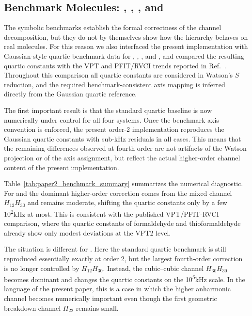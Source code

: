 \documentclass[aip,jcp,reprint]{revtex4-2}
\begin{document}
\subsection{Benchmark Molecules: \texorpdfstring{, , , and }{H2O, H2S, H2CO, and H2CS}}

The symbolic benchmarks establish the formal correctness of the channel
decomposition, but they do not by themselves show how the hierarchy
behaves on real molecules.  For this reason we also interfaced the
present implementation with Gaussian-style quartic benchmark data for
, , , and , and compared the resulting
quartic constants with the VPT and PFIT/RVCI trends reported in
Ref.~.  Throughout this comparison all quartic
constants are considered in Watson's $S$ reduction, and the required
benchmark-consistent axis mapping is inferred directly from the
Gaussian quartic reference.

The first important result is that the standard quartic baseline is now
numerically under control for all four systems.  Once the benchmark
axis convention is enforced, the present order-2 implementation
reproduces the Gaussian quartic constants with sub-\si{kHz} residuals in
all cases.  This means that the remaining differences observed at
fourth order are not artifacts of the Watson projection or of the axis
assignment, but reflect the actual higher-order channel content of the
present implementation.

Table~\ref{tab:paper2_benchmark_summary} summarizes the numerical
diagnostic.  For  and  the dominant higher-order
correction comes from the mixed channel $H_{12}H_{30}$ and remains
moderate, shifting the quartic constants only by a few
\si{10^2}{kHz} at most.  This is consistent with the published VPT/PFIT-RVCI
comparison, where the quartic constants of formaldehyde and
thioformaldehyde already show only modest deviations at the VPT2
level.\cite{Dinu2022}

The situation is different for .  Here the standard quartic
benchmark is still reproduced essentially exactly at order 2, but the
largest fourth-order correction is no longer controlled by
$H_{12}H_{30}$.  Instead, the cubic--cubic channel $H_{30}H_{30}$
becomes dominant and changes the quartic constants on the
\si{10^5}{kHz} scale.  In the language of the present paper, this is a
case in which the higher anharmonic channel becomes numerically
important even though the first geometric breakdown channel $H_{22}$
remains small.
\end{document}
